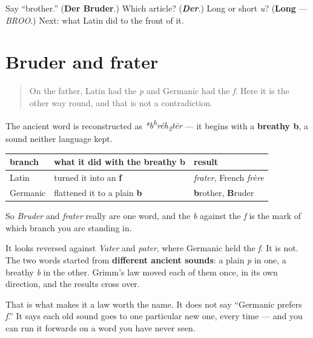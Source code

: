 \begin{tcolorbox}[breakable,colback=teal!4,colframe=teal!35!black,title={Before you move on}]
Say \textquotedblleft{}brother.\textquotedblright{} (\textbf{Der Bruder}.) Which article? (\emph{\textbf{Der}}.) Long or short \emph{u}? (\textbf{Long} — \emph{BROO}.) Next: what Latin did to the front of it.
\end{tcolorbox}
\section[Bruder und frater]{Bruder and frater}

\label{lesson:GE-C10-bruder-frater}



\begin{quote}
On the father, Latin had the \emph{p} and Germanic had the \emph{f}. Here it is the other way round, and that is not a contradiction.
\end{quote}

\begin{cousinweb}
The ancient word is reconstructed as \emph{*b\textsuperscript{h}réh\textsubscript{2}tēr} — it begins with a \textbf{breathy b}, a sound neither language kept.

\noindent
\begin{tabularx}{\linewidth}{@{}>{\raggedright\arraybackslash}X>{\raggedright\arraybackslash}X>{\raggedright\arraybackslash}X@{}}
\toprule
\textbf{branch} & \textbf{what it did with the breathy b} & \textbf{result} \\
\midrule
Latin & turned it into an \textbf{f} & \emph{frater}, French \emph{frère} \\
Germanic & flattened it to a plain \textbf{b} & \textbf{b}rother, \textbf{B}ruder \\
\bottomrule
\end{tabularx}

So \emph{Bruder} and \emph{frater} really are one word, and the \emph{b} against the \emph{f} is the mark of which branch you are standing in.
\end{cousinweb}

\begin{culture}
It looks reversed against \emph{Vater} and \emph{pater}, where Germanic held the \emph{f}. It is not. The two words started from \textbf{different ancient sounds}: a plain \emph{p} in one, a breathy \emph{b} in the other. Grimm's law moved each of them once, in its own direction, and the results cross over.

That is what makes it a law worth the name. It does not say \textquotedblleft{}Germanic prefers \emph{f}.\textquotedblright{} It says each old sound goes to one particular new one, every time — and you can run it forwards on a word you have never seen.
\end{culture}


